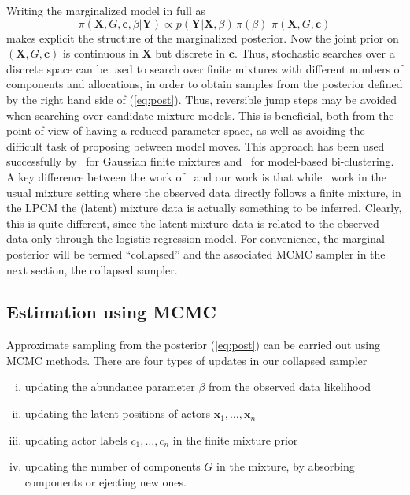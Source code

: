 \documentclass[12pt]{article}
\newcommand{\x}{{\mathbf{x}}}
\newcommand{\bX}{{\mathbf{X}}}
\newcommand{\Y}{{\mathbf{Y}}}
\newcommand{\bc}{{\mathbf{c}}}
\begin{document}
Writing the marginalized model in full as
\begin{equation}
\pi(\bX,G,\bc,\beta|\Y) \propto  p(\Y|\bX,\beta)\, \pi( \beta ) \, \, \pi( \bX, G, \bc ) \label{eq:post}
\end{equation}
makes explicit the structure of the marginalized posterior. Now the joint prior on $(\bX,G,\bc)$ is continuous in $\bX$ but discrete in $\bc$. Thus, stochastic searches over a discrete space can be used to search over finite mixtures with different numbers of components and allocations, in order to obtain samples from the posterior defined by the right hand side of (\ref{eq:post}). Thus, reversible jump steps \cite{richardson:green97} may be avoided when searching over candidate mixture models. This is beneficial, both from the point of view of having a reduced parameter space, as well as avoiding the difficult task of proposing between model moves. This approach has been used successfully by~ for Gaussian finite mixtures and~ for model-based bi-clustering. A key difference between the work of~ and our work is that while~ work in the usual mixture setting where the observed data directly follows a finite mixture, in the LPCM the (latent) mixture data is actually something to be inferred. Clearly, this is quite different, since the latent mixture data is related to the observed data only through the logistic regression model. For convenience, the marginal posterior will be termed ``collapsed'' and the associated MCMC sampler in the next section, the collapsed sampler.

\subsection{ Estimation using MCMC }

Approximate sampling from the posterior (\ref{eq:post}) can be carried out using MCMC methods. There are four types of updates in our collapsed sampler
\begin{enumerate}[(i)]
\item updating the abundance parameter $\beta$ from the observed data likelihood
\item updating the latent positions of actors $\x_1,\dots,\x_n$
\item updating actor labels $c_1,\dots,c_n$ in the finite mixture prior
\item updating the number of components $G$ in the mixture, by absorbing components or  ejecting new ones. 
\end{enumerate}
\end{document}
